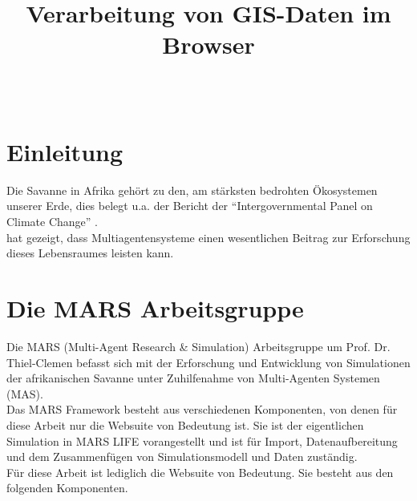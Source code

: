 \documentclass[10pt,conference,compsocconf]{IEEEtran}
\begin{document}
	\title{\textbf{\Large Verarbeitung von GIS-Daten im Browser}\\[0.2ex]}
	
	\author{
		\\
	}
	
\maketitle

\IEEEpeerreviewmaketitle



\section{Einleitung}
Die Savanne in Afrika gehört zu den, am stärksten bedrohten Ökosystemen unserer Erde, dies belegt u.a. der Bericht der \enquote{Intergovernmental Panel on Climate Change} \cite{climateReport}.\\
\cite{LUDAS} hat gezeigt, dass Multiagentensysteme einen wesentlichen Beitrag zur Erforschung dieses Lebensraumes leisten kann.



\section{Die MARS Arbeitsgruppe}
Die MARS (Multi-Agent Research \& Simulation) Arbeitsgruppe um Prof. Dr. Thiel-Clemen befasst sich mit der Erforschung und Entwicklung von Simulationen der afrikanischen Savanne unter Zuhilfenahme von Multi-Agenten Systemen (MAS). \\
Das MARS Framework besteht aus verschiedenen Komponenten, von denen für diese Arbeit nur die Websuite von Bedeutung ist. Sie ist der eigentlichen Simulation in MARS LIFE vorangestellt und ist für Import, Datenaufbereitung und dem Zusammenfügen von Simulationsmodell und Daten zuständig. \\
Für diese Arbeit ist lediglich die Websuite von Bedeutung. Sie besteht aus den folgenden Komponenten.
\end{document}
